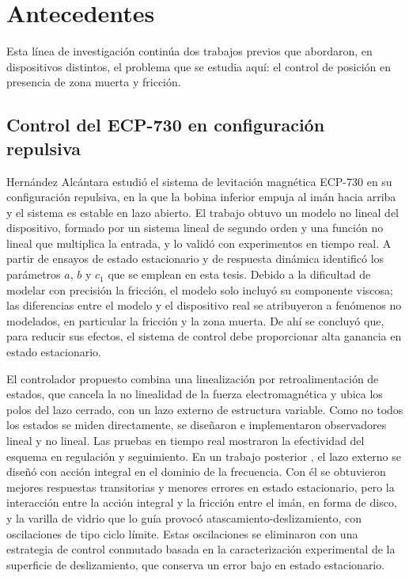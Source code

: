 \chapter{Antecedentes}\label{Chap:Antecedentes}

Esta línea de investigación continúa dos trabajos previos que abordaron, en dispositivos distintos, el problema que se estudia aquí: el control de posición en presencia de zona muerta y fricción.

\section{Control del ECP-730 en configuración repulsiva}

Hernández Alcántara \cite{diana_tesis} estudió el sistema de levitación magnética ECP-730 en su configuración repulsiva, en la que la bobina inferior empuja al imán hacia arriba y el sistema es estable en lazo abierto. El trabajo obtuvo un modelo no lineal del dispositivo, formado por un sistema lineal de segundo orden y una función no lineal que multiplica la entrada, y lo validó con experimentos en tiempo real. A partir de ensayos de estado estacionario y de respuesta dinámica identificó los parámetros $a$, $b$ y $c_1$ que se emplean en esta tesis. Debido a la dificultad de modelar con precisión la fricción, el modelo solo incluyó su componente viscosa; las diferencias entre el modelo y el dispositivo real se atribuyeron a fenómenos no modelados, en particular la fricción y la zona muerta. De ahí se concluyó que, para reducir sus efectos, el sistema de control debe proporcionar alta ganancia en estado estacionario.

El controlador propuesto combina una linealización por retroalimentación de estados, que cancela la no linealidad de la fuerza electromagnética y ubica los polos del lazo cerrado, con un lazo externo de estructura variable. Como no todos los estados se miden directamente, se diseñaron e implementaron observadores lineal y no lineal. Las pruebas en tiempo real mostraron la efectividad del esquema en regulación y seguimiento. En un trabajo posterior \cite{alcantara}, el lazo externo se diseñó con acción integral en el dominio de la frecuencia. Con él se obtuvieron mejores respuestas transitorias y menores errores en estado estacionario, pero la interacción entre la acción integral y la fricción entre el imán, en forma de disco, y la varilla de vidrio que lo guía provocó atascamiento-deslizamiento, con oscilaciones de tipo ciclo límite. Estas oscilaciones se eliminaron con una estrategia de control conmutado basada en la caracterización experimental de la superficie de deslizamiento, que conserva un error bajo en estado estacionario.

